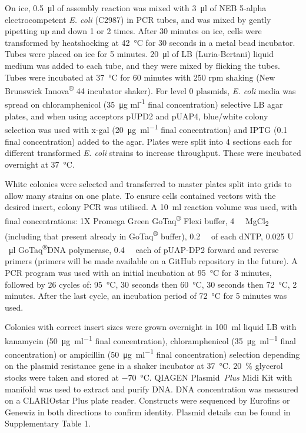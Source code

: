\documentclass[../main.tex]{subfiles}
\begin{document}
On ice, \SI{0.5}{\micro\litre} of assembly reaction was mixed with \SI{3}{\micro\litre} of NEB 5-alpha electrocompetent \textit{E. coli} (C2987) in PCR tubes, and was mixed by gently pipetting up and down 1 or 2 times.
After 30 minutes on ice, cells were transformed by heatshocking at \SI{42}{\degreeCelsius} for 30 seconds in a metal bead incubator. Tubes were placed on ice for 5 minutes.
\SI{20}{\micro\litre} of LB (Luria-Bertani) liquid medium was added to each tube, and they were mixed by flicking the tubes.
Tubes were incubated at \SI{37}{\degreeCelsius} for 60 minutes with 250 rpm shaking (New Brunswick Innova\textsuperscript{®} 44 incubator shaker).
For level 0 plasmids, \textit{E. coli} media was spread on chloramphenicol (\SI{35}{\micro\gram} ml\textsuperscript{-1} final concentration) selective LB agar plates, and when using acceptors pUPD2 and pUAP4, blue/white colony selection was used with x-gal (\SI{20}{\micro\gram\per\ml} final concentration) and IPTG (\SI{0.1}{\milli\Molar} final concentration) added to the agar.
Plates were split into 4 sections each for different transformed \textit{E. coli} strains to increase throughput.
These were incubated overnight at \SI{37}{\degreeCelsius}.

White colonies were selected and transferred to master plates split into grids to allow many strains on one plate.
To ensure cells contained vectors with the desired insert, colony PCR was utilised.
A \SI{10}{\ml} reaction volume was used, with final concentrations: 1X Promega Green GoTaq\textsuperscript{®} Flexi buffer, \SI{4}{\milli\Molar} MgCl\textsubscript{2} (including that present already in GoTaq\textsuperscript{®} buffer), \SI{0.2}{\milli\Molar} of each dNTP, 0.025 U \si{\per\micro\litre} GoTaq\textsuperscript{®}DNA polymerase, \SI{0.4}{\milli\Molar} each of pUAP\hyp{}DP2 forward and reverse primers (primers will be made available on a GitHub repository in the future).
A PCR program was used with an initial incubation at \SI{95}{\degreeCelsius} for 3 minutes, followed by 26 cycles of: \SI{95}{\degreeCelsius}, 30 seconds then \SI{60}{\degreeCelsius}, 30 seconds then \SI{72}{\degreeCelsius}, 2 minutes.
After the last cycle, an incubation period of \SI{72}{\degreeCelsius} for 5 minutes was used.

Colonies with correct insert sizes were grown overnight in \SI{100}{\ml} liquid LB with kanamycin (\SI{50}{\micro\gram\per\ml} final concentration), chloramphenicol (\SI{35}{\micro\gram\per\ml} final concentration) or ampicillin (\SI{50}{\micro\gram\per\ml} final concentration) selection depending on the plasmid resistance gene in a shaker incubator at \SI{37}{\degreeCelsius}.
\SI{20}{\percent} glycerol stocks were taken and stored at \SI{-70}{\degreeCelsius}.
QIAGEN Plasmid~\textit{Plus} Midi Kit with manifold was used to extract and purify DNA.
DNA concentration was measured on a CLARIOstar Plus plate reader.
Constructs were sequenced by Eurofins or Genewiz in both directions to confirm identity.
Plasmid details can be found in {Supplementary Table 1}.
\end{document}
